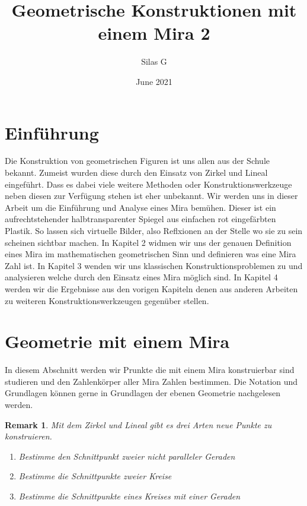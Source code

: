 \documentclass{article}
\title{Geometrische Konstruktionen mit einem Mira 2}
\author{Silas G}
\date{June 2021}
\newtheorem*{remark}{Remark}
\begin{document}
\maketitle

\section{Einführung}

Die Konstruktion von geometrischen Figuren ist uns allen aus der Schule bekannt.
Zumeist wurden diese durch den Einsatz von Zirkel und Lineal eingeführt.
Dass es dabei viele weitere Methoden oder Konstruktionswerkzeuge neben diesen zur Verfügung stehen ist eher unbekannt.
Wir werden uns in dieser Arbeit um die Einführung und Analyse eines Mira bemühen. 
Dieser ist ein aufrechtstehender halbtransparenter Spiegel aus einfachen rot eingefärbten Plastik.
So lassen sich virtuelle Bilder, also Reflxionen an der Stelle wo sie zu sein scheinen sichtbar machen.
In Kapitel 2 widmen wir uns der genauen Definition eines Mira im mathematischen geometrischen Sinn und definieren was eine Mira Zahl ist.
In Kapitel 3 wenden wir uns klassischen Konstruktionsproblemen zu und analysieren welche durch den Einsatz eines Mira möglich sind.
In Kapitel 4 werden wir die Ergebnisse aus den vorigen Kapiteln denen aus anderen Arbeiten zu weiteren Konstruktionswerkzeugen gegenüber stellen.

\section{Geometrie mit einem Mira}

In diesem Abschnitt werden wir Prunkte die mit einem Mira konstruierbar sind studieren und den Zahlenkörper aller Mira Zahlen bestimmen.
Die Notation und Grundlagen können gerne in Grundlagen der ebenen Geometrie nachgelesen werden.

\begin{remark}
    Mit dem Zirkel und Lineal gibt es drei Arten neue Punkte zu konstruieren.
    \begin{enumerate}
        \item Bestimme den Schnittpunkt zweier nicht paralleler Geraden
        \item Bestimme die Schnittpunkte zweier Kreise
        \item Bestimme die Schnittpunkte eines Kreises mit einer Geraden
    \end{enumerate}
\end{remark}
\end{document}
